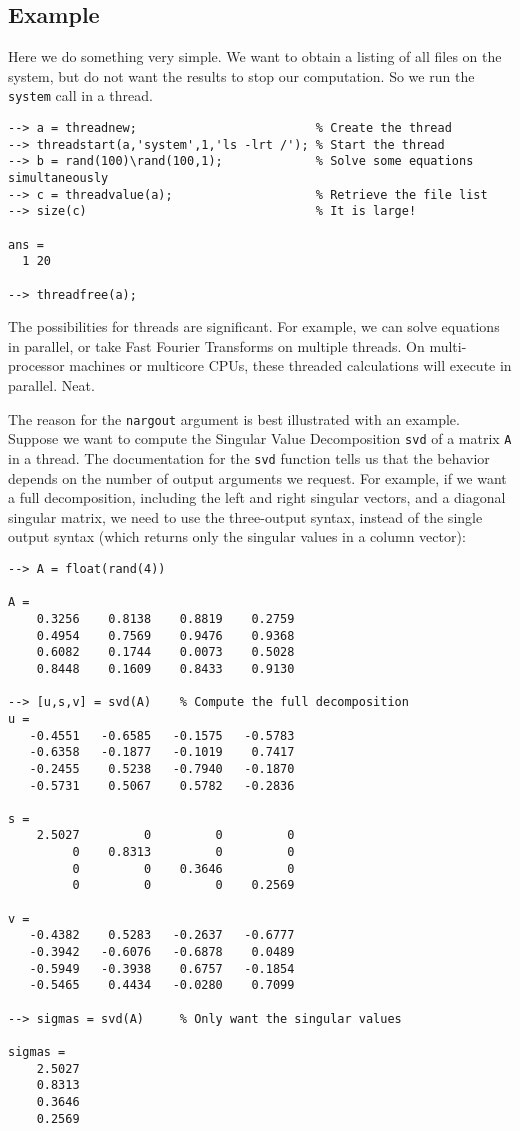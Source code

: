 \subsection{Example}

Here we do something very simple.  We want to obtain a listing of
all files on the system, but do not want the results to stop our
computation.  So we run the \verb|system| call in a thread.
\begin{verbatim}
--> a = threadnew;                         % Create the thread
--> threadstart(a,'system',1,'ls -lrt /'); % Start the thread
--> b = rand(100)\rand(100,1);             % Solve some equations simultaneously
--> c = threadvalue(a);                    % Retrieve the file list
--> size(c)                                % It is large!

ans = 
  1 20 

--> threadfree(a);
\end{verbatim}
The possibilities for threads are significant.  For example,
we can solve equations in parallel, or take Fast Fourier Transforms
on multiple threads.  On multi-processor machines or multicore CPUs,
these threaded calculations will execute in parallel.  Neat.

The reason for the  \verb|nargout| argument is best illustrated with
an example.  Suppose we want to compute the Singular Value 
Decomposition \verb|svd| of a matrix \verb|A| in a thread.  
The documentation for the \verb|svd| function tells us that
the behavior depends on the number of output arguments we request.
For example, if we want a full decomposition, including the left 
and right singular vectors, and a diagonal singular matrix, we
need to use the three-output syntax, instead of the single output
syntax (which returns only the singular values in a column vector):
\begin{verbatim}
--> A = float(rand(4))

A = 
    0.3256    0.8138    0.8819    0.2759 
    0.4954    0.7569    0.9476    0.9368 
    0.6082    0.1744    0.0073    0.5028 
    0.8448    0.1609    0.8433    0.9130 

--> [u,s,v] = svd(A)    % Compute the full decomposition
u = 
   -0.4551   -0.6585   -0.1575   -0.5783 
   -0.6358   -0.1877   -0.1019    0.7417 
   -0.2455    0.5238   -0.7940   -0.1870 
   -0.5731    0.5067    0.5782   -0.2836 

s = 
    2.5027         0         0         0 
         0    0.8313         0         0 
         0         0    0.3646         0 
         0         0         0    0.2569 

v = 
   -0.4382    0.5283   -0.2637   -0.6777 
   -0.3942   -0.6076   -0.6878    0.0489 
   -0.5949   -0.3938    0.6757   -0.1854 
   -0.5465    0.4434   -0.0280    0.7099 

--> sigmas = svd(A)     % Only want the singular values

sigmas = 
    2.5027 
    0.8313 
    0.3646 
    0.2569 
\end{verbatim}

